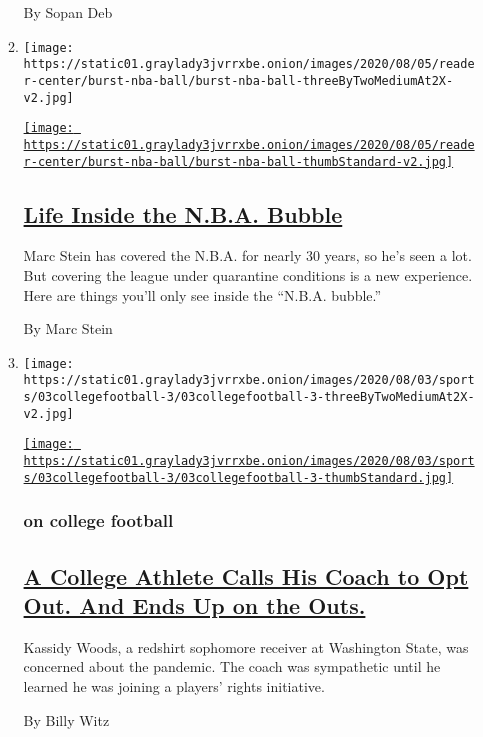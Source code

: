 \begin{enumerate}
\begin{enumerate}
    By Sopan Deb
  \item
    \texttt{[image: https://static01.graylady3jvrrxbe.onion/images/2020/08/05/reader-center/burst-nba-ball/burst-nba-ball-threeByTwoMediumAt2X-v2.jpg]}

    \href{/interactive/2020/08/04/sports/nba-bubble-coronavirus.html}{\texttt{[image: https://static01.graylady3jvrrxbe.onion/images/2020/08/05/reader-center/burst-nba-ball/burst-nba-ball-thumbStandard-v2.jpg]}}

    \hypertarget{life-inside-the-nba-bubble}{%
    \subsection{\texorpdfstring{\href{/interactive/2020/08/04/sports/nba-bubble-coronavirus.html}{Life
    Inside the N.B.A.
    Bubble}}{Life Inside the N.B.A. Bubble}}\label{life-inside-the-nba-bubble}}

    Marc Stein has covered the N.B.A. for nearly 30 years, so he's seen
    a lot. But covering the league under quarantine conditions is a new
    experience. Here are things you'll only see inside the ``N.B.A.
    bubble.''

    By Marc Stein
  \item
    \texttt{[image: https://static01.graylady3jvrrxbe.onion/images/2020/08/03/sports/03collegefootball-3/03collegefootball-3-threeByTwoMediumAt2X-v2.jpg]}

    \href{/2020/08/03/sports/coronavirus-college-athletes-opt-out.html}{\texttt{[image: https://static01.graylady3jvrrxbe.onion/images/2020/08/03/sports/03collegefootball-3/03collegefootball-3-thumbStandard.jpg]}}

    \hypertarget{on-college-football}{%
    \subsubsection{on college football}\label{on-college-football}}

    \hypertarget{a-college-athlete-calls-his-coach-to-opt-out-and-ends-up-on-the-outs}{%
    \subsection{\texorpdfstring{\href{/2020/08/03/sports/coronavirus-college-athletes-opt-out.html}{A
    College Athlete Calls His Coach to Opt Out. And Ends Up on the
    Outs.}}{A College Athlete Calls His Coach to Opt Out. And Ends Up on the Outs.}}\label{a-college-athlete-calls-his-coach-to-opt-out-and-ends-up-on-the-outs}}

    Kassidy Woods, a redshirt sophomore receiver at Washington State,
    was concerned about the pandemic. The coach was sympathetic until he
    learned he was joining a players' rights initiative.

    By Billy Witz
  \end{enumerate}
\end{enumerate}

